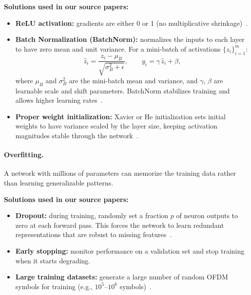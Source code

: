 \textbf{Solutions used in our source papers:}
\begin{itemize}
    \item \textbf{ReLU activation:} gradients are either 0 or 1
          (no multiplicative shrinkage)~\cite{da2024survey,kim2017novel}.
    \item \textbf{Batch Normalization (BatchNorm):} normalizes the inputs
          to each layer to have zero mean and unit variance.
          For a mini-batch of activations $\{z_i\}_{i=1}^{m}$:
          \begin{equation}
              \hat{z}_i = \frac{z_i - \mu_B}{\sqrt{\sigma_B^2 + \epsilon}},
              \qquad
              y_i = \gamma\,\hat{z}_i + \beta,
              \label{eq:batchnorm}
          \end{equation}
          where $\mu_B$ and $\sigma_B^2$ are the mini-batch mean and variance,
          and $\gamma$, $\beta$ are learnable scale and shift parameters.
          BatchNorm stabilizes training and allows higher learning
          rates~\cite{kim2017novel}.
    \item \textbf{Proper weight initialization:} Xavier or He initialization
          sets initial weights to have variance scaled by the layer
          size, keeping activation magnitudes stable through the
          network~\cite{da2024survey}.
\end{itemize}

\paragraph{Overfitting.}
A network with millions of parameters can memorize the training data
rather than learning generalizable patterns.

\textbf{Solutions used in our source papers:}
\begin{itemize}
    \item \textbf{Dropout:} during training, randomly set a fraction $p$
          of neuron outputs to zero at each forward pass.
          This forces the network to learn redundant representations
          that are robust to missing features~\cite{kim2017novel}.
    \item \textbf{Early stopping:} monitor performance on a validation set
          and stop training when it starts degrading.
    \item \textbf{Large training datasets:} generate a large number of
          random OFDM symbols for training
          (e.g., $10^5$--$10^6$ symbols)~\cite{kim2017novel,zou2021novel}.
\end{itemize}

